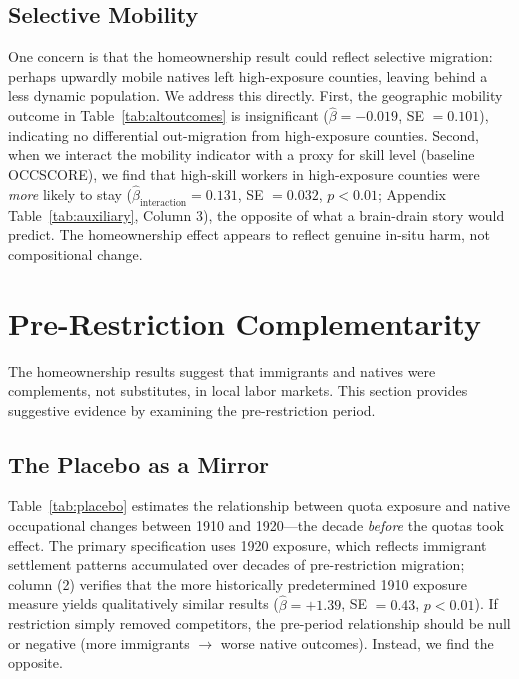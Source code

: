\documentclass[12pt]{article}
\begin{document}
\subsection{Selective Mobility}

One concern is that the homeownership result could reflect selective migration: perhaps upwardly mobile natives left high-exposure counties, leaving behind a less dynamic population. We address this directly. First, the geographic mobility outcome in Table~\ref{tab:altoutcomes} is insignificant ($\hat{\beta} = -0.019$, SE $= 0.101$), indicating no differential out-migration from high-exposure counties. Second, when we interact the mobility indicator with a proxy for skill level (baseline OCCSCORE), we find that high-skill workers in high-exposure counties were \textit{more} likely to stay ($\hat{\beta}_{\text{interaction}} = 0.131$, SE $= 0.032$, $p < 0.01$; Appendix Table~\ref{tab:auxiliary}, Column 3), the opposite of what a brain-drain story would predict. The homeownership effect appears to reflect genuine in-situ harm, not compositional change.



\section{Pre-Restriction Complementarity}
\label{sec:complementarity}

The homeownership results suggest that immigrants and natives were complements, not substitutes, in local labor markets. This section provides suggestive evidence by examining the pre-restriction period.

\subsection{The Placebo as a Mirror}

Table~\ref{tab:placebo} estimates the relationship between quota exposure and native occupational changes between 1910 and 1920---the decade \textit{before} the quotas took effect. The primary specification uses 1920 exposure, which reflects immigrant settlement patterns accumulated over decades of pre-restriction migration; column (2) verifies that the more historically predetermined 1910 exposure measure yields qualitatively similar results ($\hat{\beta} = +1.39$, SE $= 0.43$, $p < 0.01$). If restriction simply removed competitors, the pre-period relationship should be null or negative (more immigrants $\rightarrow$ worse native outcomes). Instead, we find the opposite.
\end{document}
